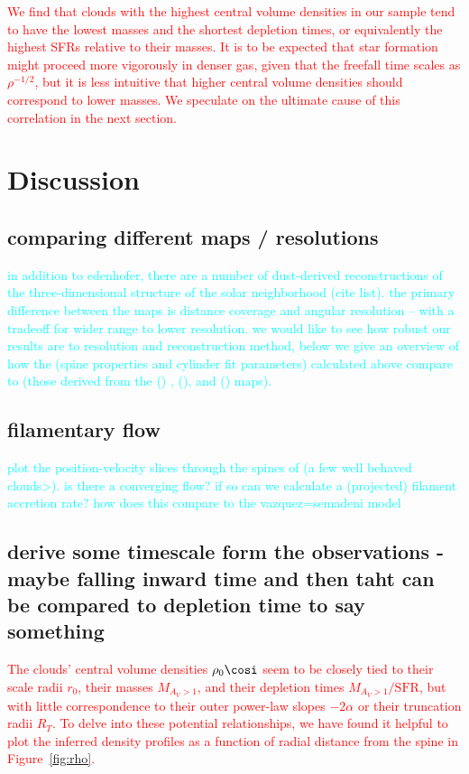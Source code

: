 \documentclass[twocolumn]{aastex631}
\begin{document}
{\textcolor{red}{We find that clouds with the highest central volume densities in our sample tend
to have the lowest masses and the shortest depletion times, or equivalently the
highest SFRs relative to their masses. It is to be expected that star formation
might proceed more vigorously in denser gas, given that the freefall time scales
as $\rho^{-1/2}$, but it is less intuitive that higher central volume densities
should correspond to lower masses. We speculate on the ultimate cause of this
correlation in the next section.}


\section{Discussion}\label{sec:discussion}
\subsection{comparing different maps / resolutions}
\textcolor{cyan}{in addition to edenhofer, there are a number of dust-derived reconstructions of the three-dimensional structure of the solar neighborhood (cite list). the primary difference between the maps is distance coverage and angular resolution -- with a tradeoff for wider range to lower resolution. we would like to see how robust our results are to resolution and reconstruction method, below we give an overview of how the (spine properties and cylinder fit parameters) calculated above compare to (those derived from the () , (), and () maps).}

\subsection{filamentary flow}
\textcolor{cyan}{plot the position-velocity slices through the spines of (a few well behaved clouds>). is there a converging flow? if so can we calculate a (projected) filament accretion rate? how does this compare to the vazquez=semadeni model
}

\subsection{derive some timescale form the observations - maybe falling inward time and then taht can be compared to depletion time to say something}
\textcolor{red}{The clouds' central volume densities
$\rho_0\cosi$ seem to be closely tied to their scale radii $r_0$, their masses
$M_{A_V > 1}$, and their depletion times $M_{A_V > 1}/\mathrm{SFR}$, but with
little correspondence to their outer power-law slopes $-2\alpha$ or their
truncation radii $R_T$. To delve into these potential relationships, we have found it helpful to plot the inferred density profiles as a function of radial distance
from the spine in Figure~\ref{fig:rho}.}

}
\end{document}
